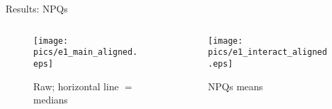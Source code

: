 \documentclass[xcolor=dvipsnames]{beamer}
\begin{document}
\begin{frame}{Results: NPQs}
    \begin{columns}
        \begin{column}{0.5\textwidth}
            \begin{figure}
                \centering
                \texttt{[image: pics/e1\_main\_aligned.eps]}
                \caption{Raw; horizontal line $=$ medians} 
                \label{fig:main1}
            \end{figure}
        \end{column}

        \begin{column}{0.5\textwidth}
            \begin{figure}
                \centering
                \texttt{[image: pics/e1\_interact\_aligned.eps]}
                \caption{NPQs means} 
                \label{fig:inter1}
            \end{figure}
        \end{column}
    \end{columns}
\end{frame}
\end{document}
